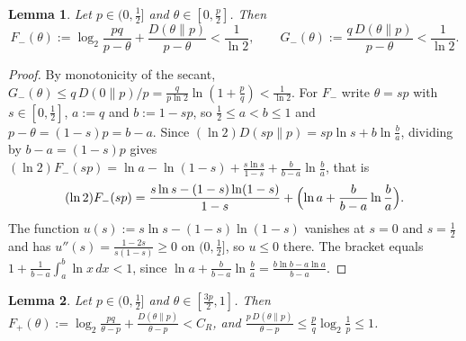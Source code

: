 \documentclass[11pt]{amsart}
\newtheorem{lemma}{Lemma}[section]
\theoremstyle{remark}
\begin{document}
\begin{lemma}\label{lem:left}
Let $p \in (0,\frac12]$ and $\theta \in [0, \frac p2]$. Then
\[
F_-(\theta) := \log_2\frac{pq}{p - \theta} + \frac{D(\theta\|p)}{p - \theta} < \frac{1}{\ln 2}, \qquad G_-(\theta) := \frac{q\,D(\theta\|p)}{p - \theta} < \frac{1}{\ln 2}.
\]
\end{lemma}

\begin{proof}
By monotonicity of the secant, $G_-(\theta) \le q\,D(0\|p)/p = \frac{q}{p\ln 2}\ln(1 + \frac pq) < \frac{1}{\ln 2}$. For $F_-$ write $\theta = sp$ with $s \in [0, \frac12]$, $a := q$ and $b := 1 - sp$, so $\frac12 \le a < b \le 1$ and $p - \theta = (1-s)p = b - a$. Since $(\ln 2)D(sp\|p) = sp\ln s + b\ln\frac ba$, dividing by $b - a = (1-s)p$ gives $(\ln 2)F_-(sp) = \ln a - \ln(1-s) + \frac{s\ln s}{1-s} + \frac{b}{b-a}\ln\frac ba$, that is
\[
(\ln 2)F_-(sp) = \frac{s\ln s - (1-s)\ln(1-s)}{1 - s} + \Bigl(\ln a + \frac{b}{b-a}\ln\frac ba\Bigr).
\]
The function $u(s) := s\ln s - (1-s)\ln(1-s)$ vanishes at $s = 0$ and $s = \frac12$ and has $u''(s) = \frac{1-2s}{s(1-s)} \ge 0$ on $(0,\frac12]$, so $u \le 0$ there. The bracket equals $1 + \frac{1}{b-a}\int_a^b \ln x\,dx < 1$, since $\ln a + \frac{b}{b-a}\ln\frac ba = \frac{b\ln b - a\ln a}{b-a}$.
\end{proof}

\begin{lemma}\label{lem:right}
Let $p \in (0,\frac12]$ and $\theta \in [\frac{3p}{2}, 1]$. Then $F_+(\theta) := \log_2\frac{pq}{\theta - p} + \frac{D(\theta\|p)}{\theta - p} < C_R$, and $\frac{p\,D(\theta\|p)}{\theta - p} \le \frac pq\log_2\frac1p \le 1$.
\end{lemma}
\end{document}

